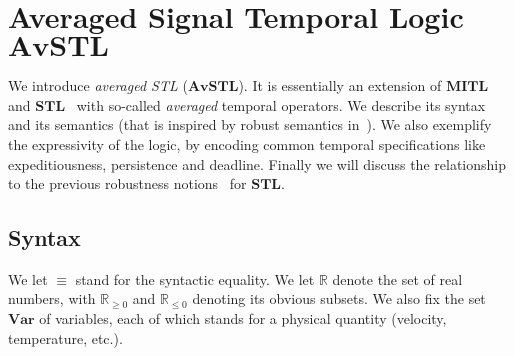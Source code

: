 \documentclass[envcountsect,orivec]{llncs} \usepackage{etex} \usepackage[]{graphicx}
\newcommand{\R}{{\mathbb{R}}}
\newcommand{\Var}{\mathbf{Var}}
\newcommand{\STL}{\textbf{STL}}
\newcommand{\AvSTL}{\textbf{AvSTL}}
\newcommand{\Rnn}{\R_{\ge 0}}
\newcommand{\Rnp}{\R_{\le 0}}
\begin{document}
\section{Averaged Signal Temporal Logic $\AvSTL$}
\label{sec:AvSTL}
We introduce \emph{averaged STL} ($\AvSTL$). It is essentially an extension of 
$\textbf{MITL}$~\cite{DBLP:dblp_journals/jacm/AlurFH96} and
$\textbf{STL}$~\cite{DBLP:conf/formats/MalerN04} with so-called
\emph{averaged} temporal operators.  We describe its syntax and
its semantics (that is inspired by robust semantics
in~\cite{DBLP:journals/tcs/FainekosP09,DBLP:conf/formats/DonzeM10}).
We also exemplify the expressivity of the logic, by encoding 
common temporal specifications like expeditiousness,
persistence and  deadline.
Finally  we will
discuss the relationship to the previous robustness notions~\cite{DBLP:journals/tcs/FainekosP09,DBLP:conf/formats/DonzeM10} for $\STL$.













\subsection{Syntax}\label{subsec:syntax}
We let $\equiv$ stand for the syntactic equality.
We let  $\R$ denote the set of real numbers, with 
$\Rnn$ and $\Rnp$ denoting its obvious subsets.
We also fix the set $\Var$ of variables, each of which 
stands for a  physical quantity (velocity, temperature, etc.). 
\end{document}
